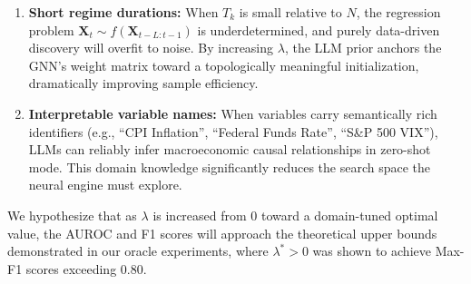 \begin{enumerate}
    \item \textbf{Short regime durations:} When $T_k$ is small relative to $N$, the regression problem $\mathbf{X}_t \sim f(\mathbf{X}_{t-L:t-1})$ is underdetermined, and purely data-driven discovery will overfit to noise. By increasing $\lambda$, the LLM prior anchors the GNN's weight matrix toward a topologically meaningful initialization, dramatically improving sample efficiency.
    \item \textbf{Interpretable variable names:} When variables carry semantically rich identifiers (e.g., ``CPI Inflation'', ``Federal Funds Rate'', ``S\&P 500 VIX''), LLMs can reliably infer macroeconomic causal relationships in zero-shot mode. This domain knowledge significantly reduces the search space the neural engine must explore.
\end{enumerate}

We hypothesize that as $\lambda$ is increased from 0 toward a domain-tuned optimal value, the AUROC and F1 scores will approach the theoretical upper bounds demonstrated in our oracle experiments, where $\lambda^* > 0$ was shown to achieve Max-F1 scores exceeding 0.80.
